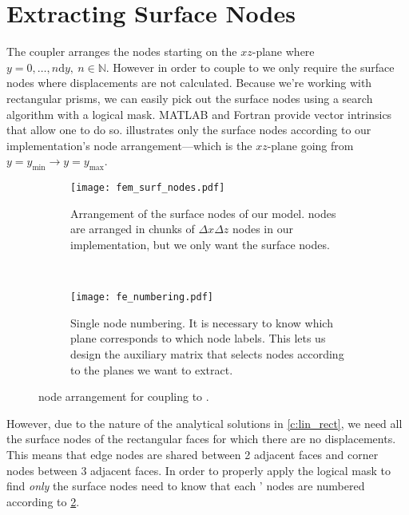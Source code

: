 	\section{Extracting Surface Nodes}
		The  coupler arranges the nodes starting on the $ xz $-plane where $ y = 0, \ldots, n \mathrm{d}y,~n\in \mathbb{N} $. However in order to couple  to  we only require the surface nodes where displacements are not calculated. Because we're working with rectangular prisms, we can easily pick out the surface nodes using a search algorithm with a logical mask. MATLAB and Fortran provide vector intrinsics that allow one to do so.  illustrates only the surface nodes according to our implementation's node arrangement---which is the $ xz $-plane going from $ y = y_{\textrm{min}} \to y = y_{\textrm{max}} $.
		\begin{figure}
			\centering
			\begin{subfigure}[b]{0.45\linewidth}
				\centering
				\texttt{[image: fem\_surf\_nodes.pdf]}
				\caption[Surface nodes of our  model.]{Arrangement of the surface nodes of our \kwd{fe} model.  nodes are arranged in chunks of $ \Delta x \Delta z $ nodes in our implementation, but we only want the surface nodes.}
				\label{f:fem_surf_nodes}
			\end{subfigure}
			~
			\begin{subfigure}[b]{0.45\linewidth}
				\centering
				\texttt{[image: fe\_numbering.pdf]}
				\caption[Single finite element node numbering.]{Single  node numbering. It is necessary to know which  plane corresponds to which node labels. This lets us design the auxiliary matrix that selects nodes according to the planes we want to extract.}
				\label{f:fe_numbering}
			\end{subfigure}
		\caption[Finite Element node arrangement for coupling to Discrete Dislocation Dynamics.]{ node arrangement for coupling to .}
		\label{f:fem_node_arr}
		\end{figure}
		However, due to the nature of the analytical solutions in \cref{c:lin_rect}, we need all the surface nodes of the rectangular faces for which there are no displacements. This means that edge nodes are shared between 2 adjacent faces and corner nodes between 3 adjacent faces. In order to properly apply the logical mask to find \emph{only} the surface nodes need to know that each ' nodes are numbered according to \cref{f:fe_numbering}.
		
